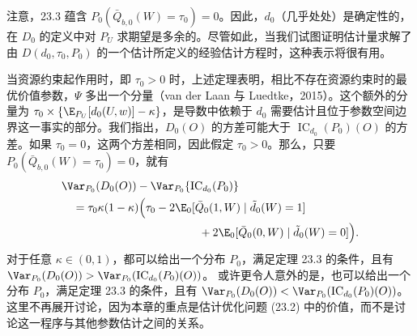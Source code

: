 注意，23.3 蕴含 $P_0(\bar Q_{b,0}(W)=\tau_0)=0$。因此，$d_0$（几乎处处）是确定性的，在 $D_0$ 的定义中对 $P_U$ 求期望是多余的。尽管如此，当我们试图证明估计量求解了由 $D(d_0,\tau_0,P_0)$ 的一个估计所定义的经验估计方程时，这种表示将很有用。

当资源约束起作用时，即 $\tau_0>0$ 时，上述定理表明，相比不存在资源约束时的最优价值参数，$\Psi$ 多出一个分量（van der Laan 与 Luedtke，2015）。这个额外的分量为 $\tau_0\times\{\E_{P_U}[d_0(U,w)]-\kappa\}$，是导数中依赖于 $d_0$ 需要估计且位于参数空间边界这一事实的部分。我们指出，$D_0(O)$ 的方差可能大于 $\operatorname{IC}_{d_0}(P_0)(O)$ 的方差。如果 $\tau_0=0$，这两个方差相同，因此假定 $\tau_0>0$。那么，只要 $P_0(\bar Q_{b,0}(W)=\tau_0)=0$，就有
\[
\begin{aligned}
 &\Var_{P_0}(D_0(O))-\Var_{P_0}\{\operatorname{IC}_{d_0}(P_0)\}\\
 &\quad=\tau_0\kappa(1-\kappa)\Bigl(\tau_0
 -2\E_0[\bar Q_0(1,W)\mid\tilde d_0(W)=1]\\
 &\hspace{12.2em}+2\E_0[\bar Q_0(0,W)\mid\tilde d_0(W)=0]\Bigr).
\end{aligned}
\]
对于任意 $\kappa\in(0,1)$，都可以给出一个分布 $P_0$，满足定理 23.3 的条件，且有
$\Var_{P_0}(D_0(O))>\Var_{P_0}(\operatorname{IC}_{d_0}(P_0)(O))$。
或许更令人意外的是，也可以给出一个分布 $P_0$，满足定理 23.3 的条件，且有
$\Var_{P_0}(D_0(O))<\Var_{P_0}(\operatorname{IC}_{d_0}(P_0)(O))$。
这里不再展开讨论，因为本章的重点是估计优化问题 (23.2) 中的价值，而不是讨论这一程序与其他参数估计之间的关系。
